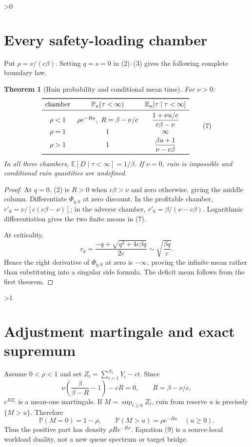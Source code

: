 \documentclass[10pt]{article}
\providecommand{\CRevisionRound}{2}
\newtheorem{theorem}{Theorem}
\newcommand{\E}{\mathbb E}
\newcommand{\Pp}{\mathbb P}
\begin{document}
\ifnum\CRevisionRound>0
\section{Every safety-loading chamber}
Put $\rho=\nu/(c\beta)$.  Setting $q=s=0$ in (2)--(3) gives the following
complete boundary law.

\begin{theorem}[Ruin probability and conditional mean time]
For $\nu>0$:
\[
\begin{array}{c@{\quad}c@{\quad}c}
\toprule
\text{chamber}&\Pp_u(\tau<\infty)&\E_u[\tau\mid\tau<\infty]\\
\midrule
\rho<1&\rho e^{-Ru},\ R=\beta-\nu/c&
\dfrac{1+\nu u/c}{c\beta-\nu}\\[5pt]
\rho=1&1&\infty\\[2pt]
\rho>1&1&\dfrac{\beta u+1}{\nu-c\beta}\\
\bottomrule
\end{array} \tag{7}
\]
In all three chambers, $\E[D\mid\tau<\infty]=1/\beta$.  If $\nu=0$, ruin is
impossible and conditional ruin quantities are undefined.
\end{theorem}

\begin{proof}
At $q=0$, (2) is $R>0$ when $c\beta>\nu$ and zero otherwise, giving the middle
column.  Differentiate $\Phi_{q,0}$ at zero discount.  In the profitable
chamber, $r'_0=\nu/[c(c\beta-\nu)]$; in the adverse chamber,
$r'_0=\beta/(\nu-c\beta)$.  Logarithmic differentiation gives the two finite
means in (7).

At criticality,
\[
 r_q=\frac{-q+\sqrt{q^2+4c\beta q}}{2c}
 \sim\sqrt{\frac{\beta q}{c}}.
\]
Hence the right derivative of $\Phi_{q,0}$ at zero is $-\infty$, proving the
infinite mean rather than substituting into a singular side formula.  The
deficit mean follows from the first theorem.
\end{proof}
\fi

\ifnum\CRevisionRound>1
\section{Adjustment martingale and exact supremum}
Assume $0<\rho<1$ and set $Z_t=\sum_{i=1}^{N_t}Y_i-ct$.  Since
\begin{equation}
 \nu\left(\frac{\beta}{\beta-R}-1\right)-cR=0,
 \qquad R=\beta-\nu/c, \tag{8}
\end{equation}
$e^{RZ_t}$ is a mean-one martingale.  If $M=\sup_{t\geq0}Z_t$, ruin from
reserve $u$ is precisely $\{M>u\}$.  Therefore
\begin{equation}
 \Pp(M=0)=1-\rho,\qquad
 \Pp(M>u)=\rho e^{-Ru}\quad(u\geq0). \tag{9}
\end{equation}
Thus the positive part has density $\rho R e^{-Rx}$.  Equation (9) is a
source-local workload duality, not a new queue spectrum or target bridge.
\fi
\end{document}
